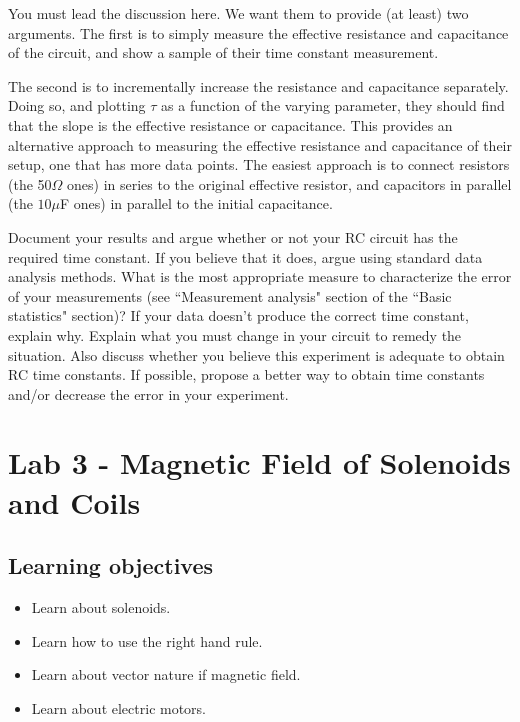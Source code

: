 \documentclass[12pt]{report}
\begin{document}
\begin{tcolorbox}
You must lead the discussion here. We want them to provide (at least) two arguments. The first is to simply measure the effective resistance and capacitance of the circuit, and show a sample of their time constant measurement.
\end{tcolorbox}
\begin{tcolorbox}
The second is to incrementally increase the resistance and capacitance separately. Doing so, and plotting $\tau$ as a function of the varying parameter, they should find that the slope is the effective resistance or capacitance.
This provides an alternative approach to measuring the effective resistance and capacitance of their setup, one that has more data points. The easiest approach is to connect resistors (the 50$\Omega$ ones) in series to the original effective resistor, and capacitors in parallel (the $10\mu$F ones) in parallel to the initial capacitance.
\end{tcolorbox}

{\color{blue}Document your results and argue whether or not your RC circuit has the required time constant. If you believe that it does, argue using standard data analysis methods. What is the most appropriate measure to characterize the error of your measurements (see ``Measurement analysis" section of the ``Basic statistics" section)? If your data doesn't produce the correct time constant, explain why. Explain what you must change in your circuit to remedy the situation. Also discuss whether you believe this experiment is adequate to obtain RC time constants. If possible, propose a better way to obtain time constants and/or decrease the error in your experiment.}


\chapter{Lab 3 - Magnetic Field of Solenoids and Coils}
\section{Learning objectives}
\begin{itemize}
\item Learn about solenoids.
\item Learn how to use the right hand rule.
\item Learn about vector nature if magnetic field.
\item Learn about electric motors.
\end{itemize}
\end{document}
